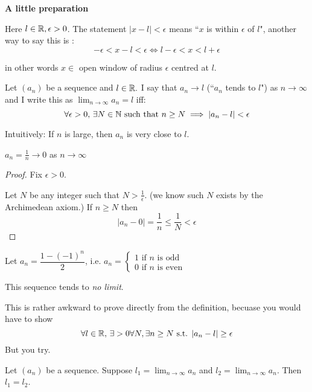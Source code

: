 \documentclass[twoside]{scrartcl}
\begin{document}
\textbf{A little preparation}

Here $l \in\mathbb{R}, \epsilon >0$. The statement $|x-l|<\epsilon$ means ``$x$ is within $\epsilon$ of $l$", another way to say this is :
\[-\epsilon < x-l<\epsilon \iff l-\epsilon < x < l + \epsilon\]

in other words $x \in$ open window of radius $\epsilon$ centred at $l$.\\



\begin{definition}
Let $(a_n)$ be a sequence and $l \in\mathbb{R}.$ I say that $a_n \to l$ (``$a_n$ tends to $l$") as $n \to \infty$ and I write this as $\lim_{n \to \infty} a_n = l$ iff: 
\[\forall \epsilon >0,\, \exists N \in\mathbb{N}\text{ such that } n \geq N \implies |a_n - l| < \epsilon\]
\end{definition}

Intuitively: If $n$ is large, then $a_n$ is very close to $l$. \\


\begin{example}
$a_n = \frac{1}{n} \to 0$ as $n \to \infty$
\begin{proof}
Fix $\epsilon >0$.

Let $N$ be any integer such that $N > \frac{1}{\epsilon}$. (we know such $N$ exists by the Archimedean axiom.) If $n \geq N$ then 
\[|a_n - 0| = \frac{1}{n} \leq \frac{1}{N} <\epsilon\]
\end{proof}
\end{example}\vspace*{5pt}

\begin{example}
Let $a_n = \dfrac{1-(-1)^n}{2}$, i.e. $a_n = \begin{cases}
 1 \mbox{ if $n$ is odd}\\
 0 \mbox{ if $n$ is even}	
 \end{cases}$
 
 This sequence tends to \emph{no limit}. 
 
 This is rather awkward to prove directly from the definition, becuase you would have to show 
 \[\forall l \in\mathbb{R},\, \exists >0 \forall N, \exists n \geq N\text{ s.t. } |a_n - l| \geq \epsilon\]
 But you try.
\end{example}



\begin{proposition}
Let $(a_n)$ be a sequence. Suppose $l_1 = \lim_{n \to \infty} a_n$ and	$l_2 = \lim_{n \to \infty} a_n$. Then $l_1 = l_2$.
\end{proposition}
\end{document}
